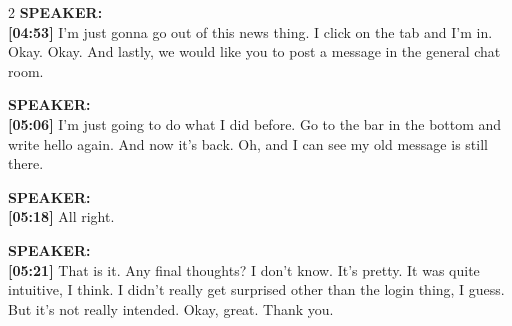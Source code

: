 {\begin{multicols}{2}
\vspace{0.3cm}
\textbf{SPEAKER:}\\
\textbf{[04:53]} I'm just gonna go out of this news thing. I click on the tab and I'm in. Okay. Okay. And lastly, we would like you to post a message in the general chat room.

\vspace{0.3cm}
\textbf{SPEAKER:}\\
\textbf{[05:06]} I'm just going to do what I did before. Go to the bar in the bottom and write hello again. And now it's back. Oh, and I can see my old message is still there.

\vspace{0.3cm}
\textbf{SPEAKER:}\\
\textbf{[05:18]} All right.

\vspace{0.3cm}
\textbf{SPEAKER:}\\
\textbf{[05:21]} That is it. Any final thoughts? I don't know. It's pretty. It was quite intuitive, I think. I didn't really get surprised other than the login thing, I guess. But it's not really intended. Okay, great. Thank you.

\vspace{0.3cm}

\end{multicols}
}

